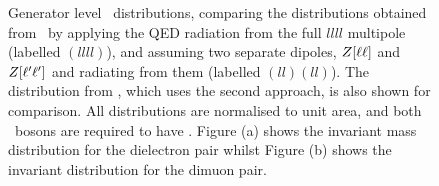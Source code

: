 \begin{figure}
\centering
        \vspace{-5mm}
        \vspace{-2mm}
    \caption{\small \small Generator level \mZ\ distributions,
    comparing the distributions obtained from \sherpa\ by applying the QED
    radiation from the full $llll$ multipole (labelled $(llll)$), and assuming two
    separate dipoles, $Z[\ell\ell]$ and $Z[\ell'\ell']$ and radiating from
    them (labelled $(ll)(ll)$). The distribution from \powhegbox, which uses the
    second approach, is also shown for comparison. All distributions are
    normalised to unit area, and both \Z\ bosons are required to have \sstooos. Figure (a)
    shows the invariant mass distribution for the dielectron pair whilst Figure 
    (b) shows the invariant distribution for the dimuon pair.
}
    \label{fig:gen-comp-SherpaQED}
\end{figure}


